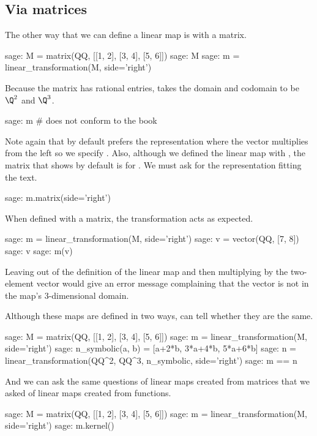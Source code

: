 \subsection{Via matrices}
The other way that we can define a linear map is with
a matrix.
\begin{sagecommandline}
sage: M = matrix(QQ, [[1, 2], [3, 4], [5, 6]])
sage: M
sage: m = linear_transformation(M, side='right')
\end{sagecommandline}
Because the matrix has rational entries, \Sage{} takes the
domain and codomain to be $\Q^2$ and $\Q^3$.
\begin{sagecommandline}
sage: m     # does not conform to the book
\end{sagecommandline}
Note again that by default \Sage{} prefers the 
representation where the vector multiplies
from the left so we specify .
Also, although we defined the linear map with
\mbox{,} 
the matrix that \Sage{} shows by default is for 
.
We must ask for the representation fitting the text.
\begin{sagecommandline}
sage: m.matrix(side='right')
\end{sagecommandline}

When defined with a matrix, the transformation acts as expected.
\begin{sagecommandline}
sage: m = linear_transformation(M, side='right')
sage: v = vector(QQ, [7, 8])
sage: v
sage: m(v)  
\end{sagecommandline}
Leaving  out of the definition of the
linear map and then multiplying 
by the two-element vector would give an error message
complaining that the vector is not in the map's 
$3$-dimensional domain.

Although these maps are defined in two ways, 
\Sage{} can tell whether they are the same.
\begin{sagecommandline}
sage: M = matrix(QQ, [[1, 2], [3, 4], [5, 6]])
sage: m = linear_transformation(M, side='right')
sage: n_symbolic(a, b) = [a+2*b, 3*a+4*b, 5*a+6*b]
sage: n = linear_transformation(QQ^2, QQ^3, n_symbolic, side='right')
sage: m == n  
\end{sagecommandline}
And we can ask the same questions of linear maps created from
matrices that we asked of linear maps created from functions.
\begin{sagecommandline}
sage: M = matrix(QQ, [[1, 2], [3, 4], [5, 6]])
sage: m = linear_transformation(M, side='right')
sage: m.kernel() 
\end{sagecommandline}

